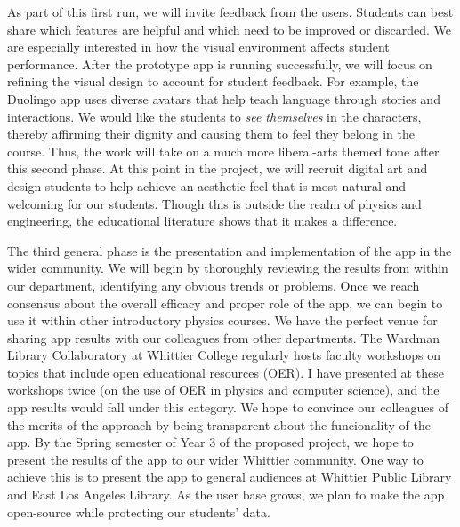\documentclass[11pt]{amsart}
\begin{document}
As part of this first run, we will invite feedback from the users.  Students can best share which features are helpful and which need to be improved or discarded.  We are especially interested in how the visual environment affects student performance.  After the prototype app is running successfully, we will focus on refining the visual design to account for student feedback.  For example, the Duolingo app uses diverse avatars that help teach language through stories and interactions.  We would like the students to \textit{see themselves} in the characters, thereby affirming their dignity and causing them to feel they belong in the course.  Thus, the work will take on a much more liberal-arts themed tone after this second phase.  At this point in the project, we will recruit digital art and design students to help achieve an aesthetic feel that is most natural and welcoming for our students.  Though this is outside the realm of physics and engineering, the educational literature shows that it makes a difference. 

The third general phase is the presentation and implementation of the app in the wider community.  We will begin by thoroughly reviewing the results from within our department, identifying any obvious trends or problems.  Once we reach consensus about the overall efficacy and proper role of the app, we can begin to use it within other introductory physics courses.  We have the perfect venue for sharing app results with our colleagues from other departments.  The Wardman Library Collaboratory at Whittier College regularly hosts faculty workshops on topics that include open educational resources (OER).  I have presented at these workshops twice (on the use of OER in physics and computer science), and the app results would fall under this category.  We hope to convince our colleagues of the merits of the approach by being transparent about the funcionality of the app.  By the Spring semester of Year 3 of the proposed project, we hope to present the results of the app to our wider Whittier community.  One way to achieve this is to present the app to general audiences at Whittier Public Library and East Los Angeles Library.  As the user base grows, we plan to make the app open-source while protecting our students' data.
\end{document}
